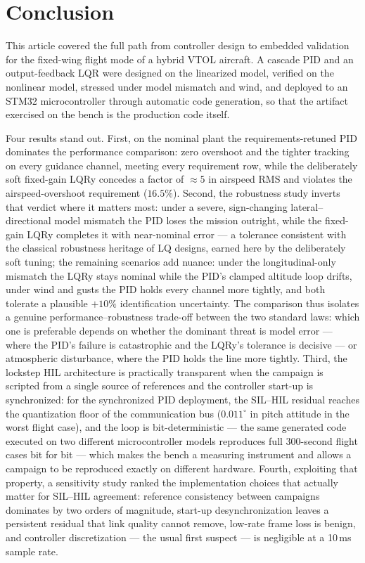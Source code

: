 \section{Conclusion}
\label{sec:conclusion}
This article covered the full path from controller design to embedded
validation for the fixed-wing flight mode of a hybrid VTOL aircraft. A
cascade PID and an output-feedback LQR were designed on the linearized
model, verified on the nonlinear model, stressed under model mismatch
and wind, and deployed to an STM32 microcontroller through automatic
code generation, so that the artifact exercised on the bench is the
production code itself.

Four results stand out. First, on the nominal plant the
requirements-retuned PID dominates the performance comparison: zero
overshoot and the tighter tracking on every guidance channel, meeting
every requirement row, while the deliberately soft fixed-gain LQRy
concedes a factor of ${\approx}5$ in airspeed RMS and violates the
airspeed-overshoot requirement ($16.5\%$). Second, the robustness
study inverts that verdict where it matters most: under a severe,
sign-changing lateral--directional model mismatch the PID loses the
mission outright, while the fixed-gain LQRy completes it with
near-nominal error --- a tolerance consistent with the classical
robustness heritage of LQ designs, earned here by the deliberately
soft tuning; the remaining scenarios add nuance: under the
longitudinal-only mismatch
the LQRy stays nominal while the PID's clamped altitude loop drifts,
under wind and gusts the PID holds every channel more tightly, and
both tolerate a plausible $+10\%$ identification uncertainty. The
comparison thus isolates a genuine performance--robustness trade-off
between the two standard laws: which one is preferable depends on
whether the dominant threat is model error --- where the PID's
failure is catastrophic and the LQRy's tolerance is decisive --- or
atmospheric disturbance, where the PID holds the line more tightly.
Third, the lockstep HIL architecture
is practically transparent when the campaign is scripted from a single
source of references and the controller start-up is synchronized: for
the synchronized PID deployment, the SIL--HIL residual reaches the
quantization floor of the communication
bus ($0.011^\circ$ in pitch attitude in the worst flight case), and the
loop is bit-deterministic --- the same generated code executed on two
different microcontroller models reproduces full 300-second flight
cases bit for bit --- which makes the bench a measuring instrument and allows a
campaign to be reproduced exactly on different hardware. Fourth,
exploiting that property, a sensitivity study ranked the implementation
choices that actually matter for SIL--HIL agreement: reference
consistency between campaigns dominates by two orders of magnitude,
start-up desynchronization leaves a persistent residual that link
quality cannot remove, low-rate frame loss is benign, and controller
discretization --- the usual first suspect --- is negligible at a
10\,ms sample rate.

